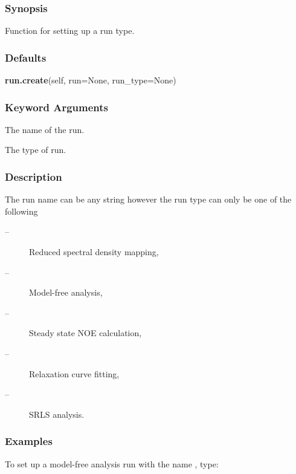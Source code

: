   
 \subsubsection{Synopsis} 

 Function for setting up a run type. 
  

  
 \subsubsection{Defaults} 

 \textsf{\textbf{run.create}(self, run=None, run\_type=None)} 

  
 \subsubsection{Keyword Arguments} 

   The name of the run.   

   The type of run.  

  

  
 \subsubsection{Description} 

 The run name can be any string however the run type can only be one of the following 
  

 \begin{description} 
 \item[ --]  Reduced spectral density mapping,  
 \item[ --]  Model-free analysis,  
 \item[ --]  Steady state NOE calculation,  
 \item[ --]  Relaxation curve fitting,  
 \item[ --]  SRLS analysis.  
 \end{description} 
  

  
 \subsubsection{Examples} 

 To set up a model-free analysis run with the name , type: 
  


